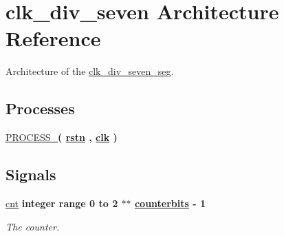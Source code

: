 \hypertarget{classclk__div__seven__seg_1_1clk__div__seven}{\section{clk\-\_\-div\-\_\-seven Architecture Reference}
\label{classclk__div__seven__seg_1_1clk__div__seven}
}


Architecture of the \hyperlink{classclk__div__seven__seg}{clk\-\_\-div\-\_\-seven\-\_\-seg}.  


\subsection*{Processes}
 \begin{DoxyCompactItemize}
\item 
\hypertarget{classclk__div__seven__seg_1_1clk__div__seven_afbf5b75c435428d734b3dd7d2f63b351}{\hyperlink{classclk__div__seven__seg_1_1clk__div__seven_afbf5b75c435428d734b3dd7d2f63b351}{P\-R\-O\-C\-E\-S\-S\-\_}{\bfseries  ( {\bfseries {\bfseries \hyperlink{classclk__div__seven__seg_aba021aec4b477b89079bb58ccadcc67e}{rstn}} \textcolor{vhdlchar}{ }\textcolor{vhdlchar}{ }\textcolor{vhdlchar}{ }} , {\bfseries {\bfseries \hyperlink{classclk__div__seven__seg_a8120037e0ee47c35ba2d79242209c72e}{clk}} \textcolor{vhdlchar}{ }} )}}\label{classclk__div__seven__seg_1_1clk__div__seven_afbf5b75c435428d734b3dd7d2f63b351}

\end{DoxyCompactItemize}
\subsection*{Signals}
 \begin{DoxyCompactItemize}
\item 
\hypertarget{classclk__div__seven__seg_1_1clk__div__seven_ac4dba71b323197d34acd6eeed07686d6}{\hyperlink{classclk__div__seven__seg_1_1clk__div__seven_ac4dba71b323197d34acd6eeed07686d6}{cnt} {\bfseries \textcolor{comment}{integer}\textcolor{vhdlchar}{ }\textcolor{vhdlkeyword}{range}\textcolor{vhdlchar}{ } \textcolor{vhdldigit}{0} \textcolor{vhdlchar}{ }\textcolor{vhdlchar}{ }\textcolor{vhdlchar}{ }\textcolor{vhdlkeyword}{to}\textcolor{vhdlchar}{ }\textcolor{vhdlchar}{ }\textcolor{vhdlchar}{ } \textcolor{vhdldigit}{2} \textcolor{vhdlchar}{ }\textcolor{vhdlchar}{$\ast$}\textcolor{vhdlchar}{$\ast$}\textcolor{vhdlchar}{ }{\bfseries \hyperlink{classclk__div__seven__seg_a8e97268cd0d50c552668e2c1d8719c2c}{counterbits}} \textcolor{vhdlchar}{ }\textcolor{vhdlchar}{-\/}\textcolor{vhdlchar}{ } \textcolor{vhdldigit}{1} \textcolor{vhdlchar}{ }} }\label{classclk__div__seven__seg_1_1clk__div__seven_ac4dba71b323197d34acd6eeed07686d6}

\begin{DoxyCompactList}\small\item\em The counter. \end{DoxyCompactList}\end{DoxyCompactItemize}


